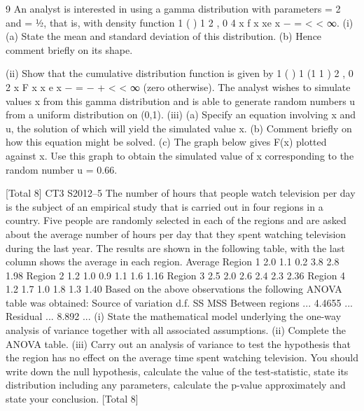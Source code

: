 \documentclass[a4paper,12pt]{article}
\begin{document}
\begin{enumerate}
9 An analyst is interested in using a gamma distribution with parameters \alpha = 2 and
\lambda = ½, that is, with density function
1
( ) 1 2 , 0
4
x
f x xe x
−
= < < ∞.
(i) (a) State the mean and standard deviation of this distribution.
(b) Hence comment briefly on its shape.

(ii) Show that the cumulative distribution function is given by
1
( ) 1 (1 1 ) 2 , 0
2
x
F x x e x
−
= − + < < ∞ (zero otherwise). 
The analyst wishes to simulate values x from this gamma distribution and is able to
generate random numbers u from a uniform distribution on (0,1).
(iii) (a) Specify an equation involving x and u, the solution of which will yield
the simulated value x.
(b) Comment briefly on how this equation might be solved.
(c) The graph below gives F(x) plotted against x. Use this graph to obtain
the simulated value of x corresponding to the random number u = 0.66.

[Total 8]
CT3 S2012–5  The number of hours that people watch television per day is the subject of an
empirical study that is carried out in four regions in a country. Five people are
randomly selected in each of the regions and are asked about the average number of
hours per day that they spent watching television during the last year. The results are
shown in the following table, with the last column shows the average in each region.
Average
Region 1 2.0 1.1 0.2 3.8 2.8 1.98
Region 2 1.2 1.0 0.9 1.1 1.6 1.16
Region 3 2.5 2.0 2.6 2.4 2.3 2.36
Region 4 1.2 1.7 1.0 1.8 1.3 1.40
Based on the above observations the following ANOVA table was obtained:
  Source of variation d.f. SS MSS
Between regions ... 4.4655 ...
Residual ... 8.892 ...
(i) State the mathematical model underlying the one-way analysis of variance
together with all associated assumptions. 
(ii) Complete the ANOVA table. 
(iii) Carry out an analysis of variance to test the hypothesis that the region has no
effect on the average time spent watching television. You should write down
the null hypothesis, calculate the value of the test-statistic, state its distribution
including any parameters, calculate the p-value approximately and state your
conclusion. 
[Total 8]
  

\end{enumerate}
\end{document}
